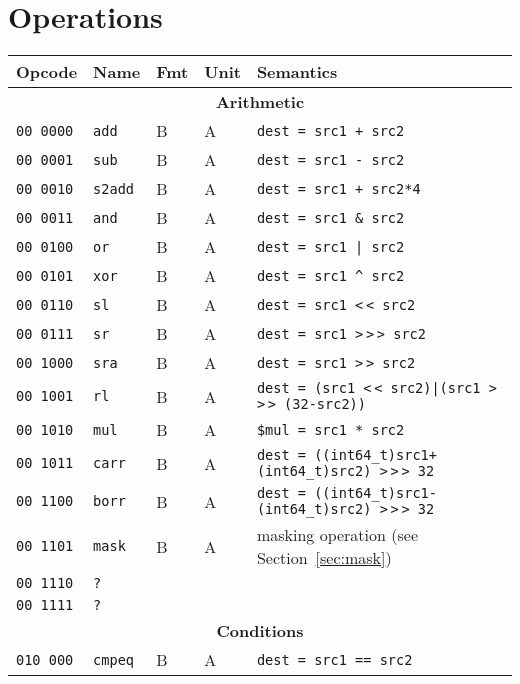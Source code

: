 \documentclass[10pt,DIV12]{scrartcl}
\newcommand{\shl}{\textless$\,\!$\textless}
\newcommand{\shr}{\textgreater$\,\!$\textgreater$\,\!$\textgreater}
\newcommand{\ashr}{\textgreater$\,\!$\textgreater}
\begin{document}
\pagebreak

\section{Operations}

\begin{longtable}{llllp{}}
\toprule
Opcode & Name & Fmt & Unit & Semantics \\
\midrule
\multicolumn{5}{c}{\textsf{\textbf{Arithmetic}}} \\
\cmidrule{1-5}
\texttt{00 0000} & \texttt{add} & B & A & \texttt{dest = src1 + src2} \\
\texttt{00 0001} & \texttt{sub} & B & A & \texttt{dest = src1 - src2} \\
\texttt{00 0010} & \texttt{s2add} & B & A & \texttt{dest = src1 + src2*4} \\
\texttt{00 0011} & \texttt{and} & B & A & \texttt{dest = src1 \& src2} \\
\texttt{00 0100} & \texttt{or} & B & A & \texttt{dest = src1 | src2} \\
\texttt{00 0101} & \texttt{xor} & B & A & \texttt{dest = src1 \textasciicircum{} src2} \\
\texttt{00 0110} & \texttt{sl} & B & A & \texttt{dest = src1 \shl{} src2} \\
\texttt{00 0111} & \texttt{sr} & B & A & \texttt{dest = src1 \shr{} src2} \\
\texttt{00 1000} & \texttt{sra} & B & A & \texttt{dest = src1 \ashr{} src2} \\
\texttt{00 1001} & \texttt{rl} & B & A & \texttt{dest = (src1 \shl{} src2)|(src1 \shr{} (32-src2))} \\
\texttt{00 1010} & \texttt{mul} & B & A & \texttt{\$mul = src1 * src2} \\
\texttt{00 1011} & \texttt{carr} & B & A & \texttt{dest = ((int64\_t)src1+(int64\_t)src2) \shr{} 32} \\
\texttt{00 1100} & \texttt{borr} & B & A & \texttt{dest = ((int64\_t)src1-(int64\_t)src2) \shr{} 32} \\
\texttt{00 1101} & \texttt{mask} & B & A & masking operation (see Section~\ref{sec:mask}) \\
\texttt{00 1110} & \texttt{?} & & & \\
\texttt{00 1111} & \texttt{?} & & & \\
\midrule
\multicolumn{5}{c}{\textsf{\textbf{Conditions}}} \\
\cmidrule{1-5}
\texttt{010 000} & \texttt{cmpeq} & B & A & \texttt{dest = src1 == src2} \\

\end{longtable}
\end{document}
